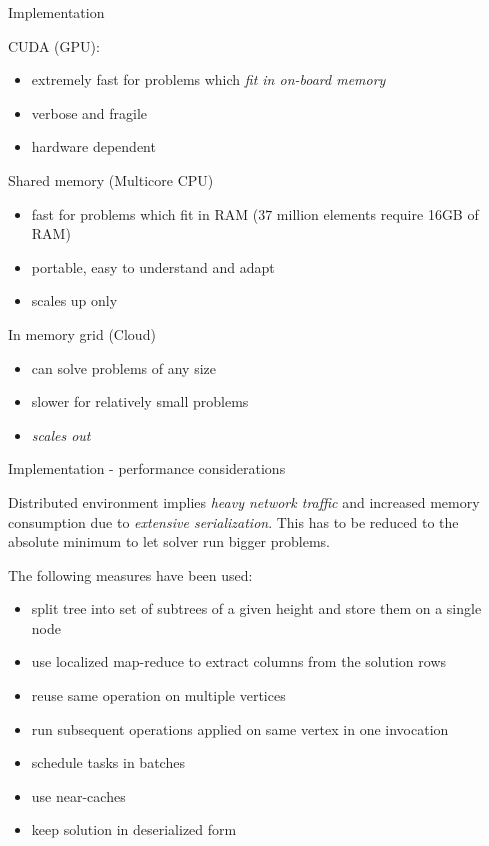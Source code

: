 \documentclass[c]{beamer}
\begin{document}
\begin{frame}{Implementation}

CUDA (GPU):
\begin{itemize}
  \item extremely fast for problems which \emph{fit in on-board memory}
  \item verbose and fragile
  \item hardware dependent
\end{itemize}

\vskip 0.1in

Shared memory (Multicore CPU)
\begin{itemize}
  \item fast for problems which fit in RAM ($37$ million elements require 16GB of RAM)
  \item portable, easy to understand and adapt
  \item scales up only
\end{itemize}

\vskip 0.1in

In memory grid (Cloud)
\begin{itemize}
  \item can solve problems of any size
  \item slower for relatively small problems
  \item \emph{scales out}
\end{itemize}

\end{frame}


\begin{frame}{Implementation - performance considerations}

Distributed environment implies \emph{heavy network traffic} and increased memory consumption due to \emph{extensive serialization}. This has to be reduced to the absolute minimum to let solver run bigger problems.
\vskip 0.1in

The following measures have been used:
\begin{itemize}
  \item split tree into set of subtrees of a given height and store them on a single node
  \item use localized map-reduce to extract columns from the solution rows
  \item reuse same operation on multiple vertices
  \item run subsequent operations applied on same vertex in one invocation
  \item schedule tasks in batches
  \item use near-caches
  \item keep solution in deserialized form
\end{itemize}

\end{frame}
\end{document}
